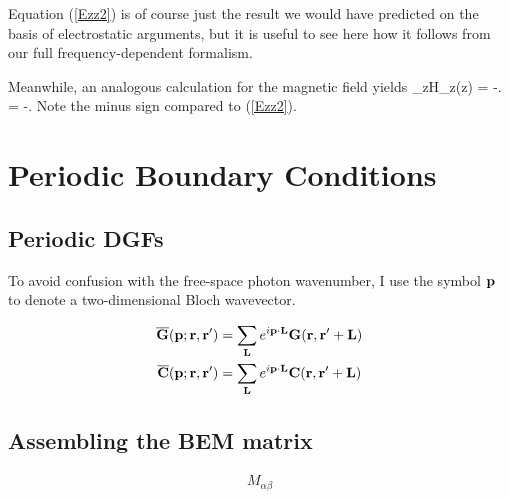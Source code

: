 \documentclass[letterpaper]{article}
\begin{document}
Equation (\ref{Ezz2}) is of course just the result we 
would have predicted on the basis of electrostatic 
arguments, but it is useful to see here how it follows 
from our full frequency-dependent formalism.

Meanwhile, an analogous calculation for the magnetic field yields
{\lim_{z}H_z(z) 
   = -.
   = -.
}
Note the minus sign compared to (\ref{Ezz2}).

\newpage
\newcommand{\GBar}{\overline{\vb G}}
\newcommand{\CBar}{\overline{\vb C}}

\section{Periodic Boundary Conditions}

\subsection{Periodic DGFs}

To avoid confusion with the free-space photon wavenumber, 
I use the symbol $\mathbf{p}$ to denote a two-dimensional 
Bloch wavevector.

\begin{align*}
  \GBar(\vb p; \vb r, \vb r^\prime)
&= \sum_{\vb L} e^{i \vb p \cdot \vb L} \vb G(\vb r, \vb r^\prime+\vb L)
\\
  \CBar(\vb p; \vb r, \vb r^\prime)
&= \sum_{\vb L} e^{i \vb p \cdot \vb L} \vb C(\vb r, \vb r^\prime+\vb L)
\end{align*}

\subsection{Assembling the BEM matrix}

\begin{align*}
M_{\alpha\beta}
\end{align*}

\appendix

 
 
 
\end{document}
